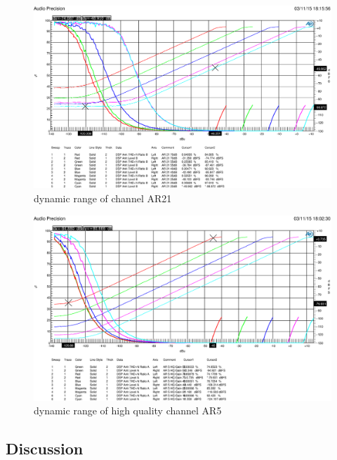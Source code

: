 \documentclass[11pt]{report}
\begin{document}
\begin{figure}[htbp]
\begin{center}
\includegraphics[width=14cm,keepaspectratio=true]{THDAR21dBVergleich}
\caption{dynamic range of channel AR21}
\label{Abb.:1}
\end{center}
\end{figure}

\begin{figure}[htbp]
\begin{center}
\includegraphics[width=14cm,keepaspectratio=true]{THDAR5HQdBVergleich}
\caption{dynamic range of high quality channel AR5}
\label{Abb.:1}
\end{center}
\end{figure}

	\subsection{Discussion}

\end{document}
